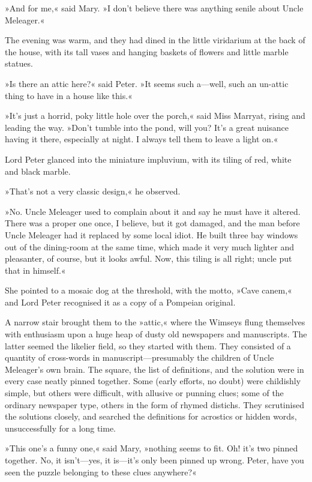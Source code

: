 »And for me,« said Mary. »I don't believe there was anything senile about Uncle Meleager.«

The evening was warm, and they had dined in the little viridarium at the back of the house, with its tall vases and hanging baskets of flowers and little marble statues.

»Is there an attic here?« said Peter. »It seems such a—well, such an un-attic thing to have in a house like this.«

»It's just a horrid, poky little hole over the porch,« said Miss Marryat, rising and leading the way. »Don't tumble into the pond, will you? It's a great nuisance having it there, especially at night. I always tell them to leave a light on.«

Lord Peter glanced into the miniature impluvium, with its tiling of red, white and black marble.

»That's not a very classic design,« he observed.

»No. Uncle Meleager used to complain about it and say he must have it altered. There was a proper one once, I believe, but it got damaged, and the man before Uncle Meleager had it replaced by some local idiot. He built three bay windows out of the dining-room at the same time, which made it very much lighter and pleasanter, of course, but it looks awful. Now, this tiling is all right; uncle put that in himself.«

She pointed to a mosaic dog at the threshold, with the motto, »Cave canem,« and Lord Peter recognised it as a copy of a Pompeian original.

A narrow stair brought them to the »attic,« where the Wimseys flung themselves with enthusiasm upon a huge heap of dusty old newspapers and manuscripts. The latter seemed the likelier field, so they started with them. They consisted of a quantity of cross-words in manuscript—presumably the children of Uncle Meleager's own brain. The square, the list of definitions, and the solution were in every case neatly pinned together. Some (early efforts, no doubt) were childishly simple, but others were difficult, with allusive or punning clues; some of the ordinary newspaper type, others in the form of rhymed distichs. They scrutinised the solutions closely, and searched the definitions for acrostics or hidden words, unsuccessfully for a long time.

»This one's a funny one,« said Mary, »nothing seems to fit. Oh! it's two pinned together. No, it isn't—yes, it is—it's only been pinned up wrong. Peter, have you seen the puzzle belonging to these clues anywhere?«

